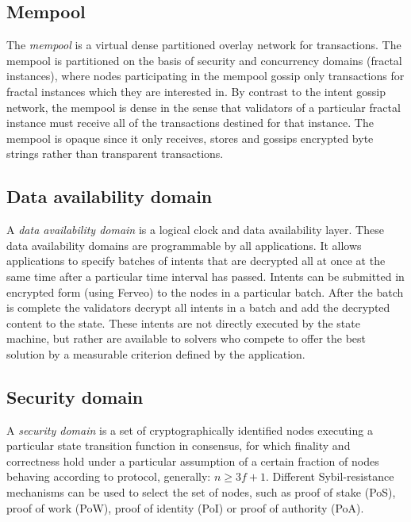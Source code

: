 \documentclass[
    9pt,            %
    commun,        %
    affiltop,       %
]{art}
\begin{document}
\subsection{Mempool}\label{mempool}

The \emph{mempool} is a virtual dense partitioned overlay network for
transactions. The mempool is partitioned on the basis of security and
concurrency domains (fractal instances), where nodes participating in
the mempool gossip only transactions for fractal instances which they
are interested in. By contrast to the intent gossip network, the mempool
is dense in the sense that validators of a particular fractal instance
must receive all of the transactions destined for that instance. The
mempool is opaque since it only receives, stores and gossips encrypted
byte strings rather than transparent transactions.

\subsection{Data availability domain}\label{data-availability-domain}

A \emph{data availability domain} is a logical clock and data
availability layer. These data availability domains are programmable by
all applications. It allows applications to specify batches of intents
that are decrypted all at once at the same time after a particular time
interval has passed. Intents can be submitted in encrypted form (using
Ferveo) to the nodes in a particular batch. After the batch is complete
the validators decrypt all intents in a batch and add the decrypted
content to the state. These intents are not directly executed by the
state machine, but rather are available to solvers who compete to offer
the best solution by a measurable criterion defined by the application.

\subsection{Security domain}\label{security-domain}

A \emph{security domain} is a set of cryptographically identified nodes
executing a particular state transition function in consensus, for which
finality and correctness hold under a particular assumption of a certain
fraction of nodes behaving according to protocol, generally: $n
\geq 3f + 1$. Different Sybil-resistance mechanisms can be
used to select the set of nodes, such as proof of stake (PoS), proof of
work (PoW), proof of identity (PoI) or proof of authority (PoA).
\end{document}
